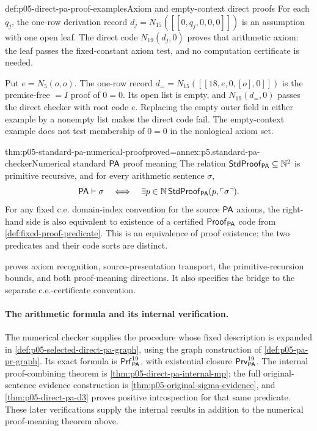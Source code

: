 \begin{hbexample}{def:p05-direct-pa-proof-examples}{Axiom and empty-context direct proofs}
For each \(q_j\), the one-row derivation record
\(d_j=N_{15}([[0,q_j,0,0,0]])\) is an assumption with one open leaf.
The direct code \(N_{19}(d_j,0)\) proves that arithmetic axiom: the leaf
passes the fixed-constant axiom test, and no computation certificate is needed.

Put \(e=N_5(o,o)\).  The one-row record
\(d_{=}=N_{15}([[18,e,0,[o],0]])\) is the premise-free \(=I\) proof
of \(0=0\).  Its open list is empty, and \(N_{19}(d_{=},0)\) passes
the direct checker with root code \(e\).  Replacing the empty outer
field in either example by a nonempty list makes the direct code fail.
The empty-context example does not test membership of \(0=0\) in the
nonlogical axiom set.
\end{hbexample}

\begin{hbtheorem}{thm:p05-standard-pa-numerical-proof}{proved=annex:p5.standard-pa-checker}{Numerical standard \(\mathsf{PA}\) proof meaning}
The relation \(\mathsf{StdProof}_{\mathsf{PA}}\subseteq\mathbb{N}^2\) is primitive
recursive, and for every arithmetic sentence \(\sigma\),
\[
 \mathsf{PA}\vdash\sigma
   \quad\Longleftrightarrow\quad
 \exists p\in\mathbb{N}\,\mathsf{StdProof}_{\mathsf{PA}}
                         (p,\ulcorner\sigma\urcorner).
\]
For any fixed c.e. domain-index convention for the source \(\mathsf{PA}\) axioms,
the right-hand side is also equivalent to existence of a certified
\(\mathsf{Proof}_{\mathsf{PA}}\) code from
\cref{def:fixed-proof-predicate}.  This is an equivalence of proof existence;
the two predicates and their code sorts are distinct.
\end{hbtheorem}
 proves axiom recognition, source-presentation
transport, the primitive-recursion bounds, and both proof-meaning directions.
It also specifies the bridge to the separate c.e.-certificate convention.

\paragraph{The arithmetic formula and its internal verification.}
The numerical checker supplies the procedure whose fixed description is
expanded in \cref{def:p05-selected-direct-pa-graph}, using the graph
construction of \cref{def:p05-pa-pr-graph}. Its exact formula is
\(\mathsf{Prf}^{19}_{\mathsf{PA}}\), with existential closure
\(\mathsf{Prv}^{19}_{\mathsf{PA}}\).
The internal proof-combining theorem is
\cref{thm:p05-direct-pa-internal-mp}; the full original-sentence
evidence construction is \cref{thm:p05-original-sigma-evidence}, and
\cref{thm:p05-direct-pa-d3} proves positive introspection for that
same predicate. These later verifications supply the internal results
in addition to the numerical proof-meaning theorem above.
